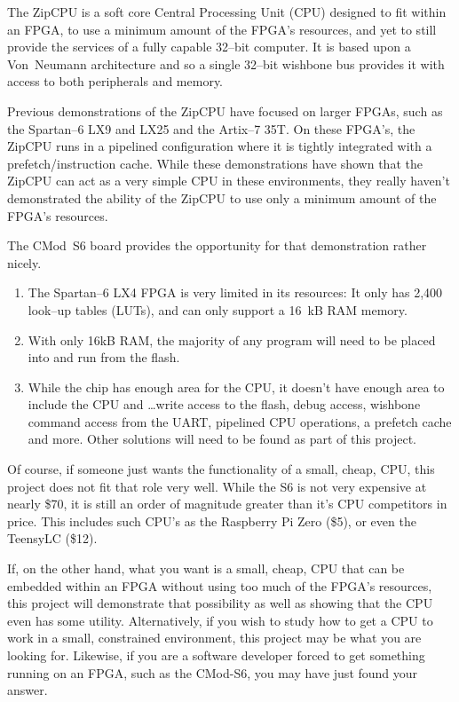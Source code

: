 \documentclass{gqtekspec}
\begin{document}
The ZipCPU is a soft core Central Processing Unit (CPU) designed to fit within
an FPGA, to use a minimum amount of the FPGA's resources, and yet to still
provide the services of a fully capable 32--bit computer.  It is based upon a
Von~Neumann architecture and so a single 32--bit wishbone bus provides it with
access to both peripherals and memory.

Previous demonstrations of the ZipCPU have focused on larger FPGAs, such as
the Spartan--6 LX9 and LX25 and the Artix--7 35T.  On these FPGA's,
the ZipCPU runs in a pipelined configuration where it is tightly integrated
with a prefetch/instruction cache.  While these demonstrations have shown that
the ZipCPU can act as a very simple CPU in these environments, they really
haven't demonstrated the ability of the ZipCPU to use only a minimum amount
of the FPGA's resources.

The CMod~S6 board provides the opportunity for that demonstration rather nicely.
\begin{enumerate}
\item The Spartan--6 LX4 FPGA is very limited in its resources:
	It only has 2,400 look--up tables (LUTs), and can only support
	a 16~kB RAM memory.
\item With only 16kB RAM, the majority of any program will need to be placed
	into and run from the flash.
\item While the chip has enough area for the CPU, it doesn't have enough area
	to include the CPU and \ldots write access to the flash, debug access,
	wishbone command access from the UART, pipelined CPU operations,
	a prefetch cache and more.  Other solutions will need to be found as
	part of this project.
\end{enumerate}

Of course, if someone just wants the functionality of a small, cheap, CPU,
this project does not fit that role very well.  While the S6 is not very
expensive at nearly \$70, it is still an order of magnitude greater than it's
CPU competitors in price.  This includes such CPU's as the Raspberry Pi Zero
(\$5), or even the TeensyLC (\$12).


If, on the other hand, what you want is a small, cheap, CPU that can be
embedded within an FPGA without using too much of the FPGA's resources, this
project will demonstrate that possibility as well as showing that the CPU even
has some utility.  Alternatively, if you wish to study how to get a CPU to
work in a small, constrained environment, this project may be what you are
looking for.  Likewise, if you are a software developer forced to get something
running on an FPGA, such as the CMod-S6, you may have just found your answer.
\end{document}
